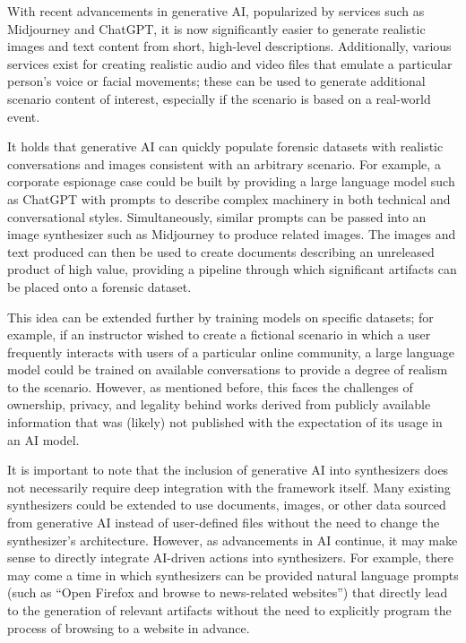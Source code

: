 \documentclass[letterpaper,12pt]{report}
\begin{document}
With recent advancements in generative AI, popularized by services such
as Midjourney and ChatGPT, it is now significantly easier to generate
realistic images and text content from short, high-level descriptions.
Additionally, various services exist for creating realistic audio and
video files that emulate a particular person's voice or facial
movements; these can be used to generate additional scenario content of
interest, especially if the scenario is based on a real-world event.

It holds that generative AI can quickly populate forensic datasets with
realistic conversations and images consistent with an arbitrary
scenario. For example, a corporate espionage case could be built by
providing a large language model such as ChatGPT with prompts to
describe complex machinery in both technical and conversational styles.
Simultaneously, similar prompts can be passed into an image synthesizer
such as Midjourney to produce related images. The images and text
produced can then be used to create documents describing an unreleased
product of high value, providing a pipeline through which significant
artifacts can be placed onto a forensic dataset.

This idea can be extended further by training models on specific
datasets; for example, if an instructor wished to create a fictional
scenario in which a user frequently interacts with users of a particular
online community, a large language model could be trained on available
conversations to provide a degree of realism to the scenario. However,
as mentioned before, this faces the challenges of ownership, privacy,
and legality behind works derived from publicly available information
that was (likely) not published with the expectation of its usage in an
AI model.

It is important to note that the inclusion of generative AI into
synthesizers does not necessarily require deep integration with the
framework itself. Many existing synthesizers could be extended to use
documents, images, or other data sourced from generative AI instead of
user-defined files without the need to change the synthesizer's
architecture. However, as advancements in AI continue, it may make sense
to directly integrate AI-driven actions into synthesizers. For example,
there may come a time in which synthesizers can be provided natural
language prompts (such as ``Open Firefox and browse to news-related
websites'') that directly lead to the generation of relevant artifacts
without the need to explicitly program the process of browsing to a
website in advance.
\end{document}
